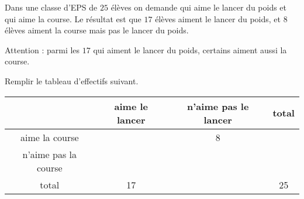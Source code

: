 
\begin{exercice}\label{exosmath-0097}

    Dans une classe d'EPS de \( 25\) élèves on demande qui aime le lancer du poids et qui aime la course. Le résultat est que \( 17\) élèves aiment le lancer du poids, et \( 8\) élèves aiment la course mais pas le lancer du poids.

    Attention : parmi les \( 17\) qui aiment le lancer du poids, certains aiment aussi la course.

    Remplir le tableau d'effectifs suivant.

    \begin{center}
    \begin{tabular}[]{|c||c|c||c|}
        \hline
        &aime le lancer&n'aime pas le lancer&total\\
        \hline\hline
        aime la course&&8&\\
        \hline
        n'aime pas la course&&&\\
        \hline
        total&17&&25\\
        \hline
    \end{tabular}
    \end{center}

\end{exercice}
